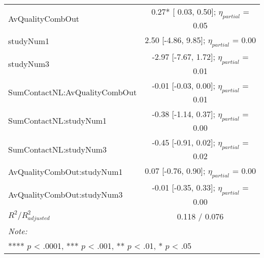 \begin{landscape}
\begin{table}
\begin{minipage}[t][\textheight][t]{\textwidth}
{\begin{tabular}[t]{lcccccc}
\hspace{1em}AvQualityCombOut & \multicolumn{6}{c}{ 0.27* [ 0.03,  0.50]; $\eta_{partial}$ = 0.05}\\
\hspace{1em}studyNum1 & \multicolumn{6}{c}{ 2.50 [-4.86,  9.85]; $\eta_{partial}$ = 0.00}\\
\hspace{1em}studyNum3 & \multicolumn{6}{c}{-2.97 [-7.67,  1.72]; $\eta_{partial}$ = 0.01}\\
\hspace{1em}SumContactNL:AvQualityCombOut & \multicolumn{6}{c}{-0.01 [-0.03,  0.00]; $\eta_{partial}$ = 0.01}\\
\hspace{1em}SumContactNL:studyNum1 & \multicolumn{6}{c}{-0.38 [-1.14,  0.37]; $\eta_{partial}$ = 0.00}\\
\hspace{1em}SumContactNL:studyNum3 & \multicolumn{6}{c}{-0.45 [-0.91,  0.02]; $\eta_{partial}$ = 0.02}\\
\hspace{1em}AvQualityCombOut:studyNum1 & \multicolumn{6}{c}{ 0.07 [-0.76,  0.90]; $\eta_{partial}$ = 0.00}\\
\hspace{1em}AvQualityCombOut:studyNum3 & \multicolumn{6}{c}{-0.01 [-0.35,  0.33]; $\eta_{partial}$ = 0.00}\\
\hspace{1em}$R^2 / R^2_{adjusted}$ & \multicolumn{6}{c}{0.118 / 0.076}\\
\bottomrule
\multicolumn{7}{l}{\rule{0pt}{1em}\textit{Note: }}\\
\multicolumn{7}{l}{\rule{0pt}{1em}**** $p$ < .0001, *** $p$ < .001, ** $p$ < .01, * $p$ < .05}\\
\end{tabular}}
\end{minipage}
\end{table}
\end{landscape}
